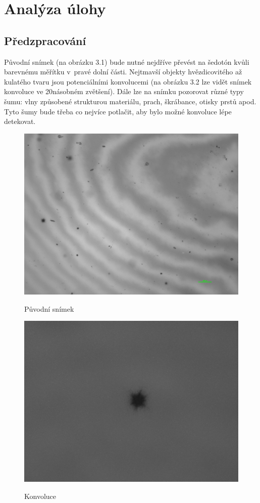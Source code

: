 \documentclass[12pt, a4paper]{report}
\begin{document}
\chapter{Analýza úlohy}
	\section{Předzpracování}
	Původní snímek (na obrázku 3.1) bude nutné nejdříve převést na šedotón kvůli barevnému měřítku v~pravé dolní části. Nejtmavší objekty hvězdicovitého až kulatého tvaru jsou potenciálními konvolucemi (na obrázku 3.2 lze vidět snímek konvoluce ve 20násobném zvětšení). Dále lze na snímku pozorovat různé typy šumu: vlny způsobené strukturou materiálu, prach, škrábance, otisky prstů apod. Tyto šumy bude třeba co nejvíce potlačit, aby bylo možné konvoluce lépe detekovat.
		
	\begin{figure}[!htb]
	\centering
	\includegraphics[scale=0.4]{obrazky/puvodni.png}
	\label{fig:puvodni}
	\caption{Původní snímek}
	\end{figure}
	
	\begin{figure}[!htb]
	\centering
	\includegraphics[scale=0.12]{obrazky/konvoluce.png}
	\label{fig:konvoluce}
	\caption{Konvoluce}
	\end{figure}	
\end{document}
